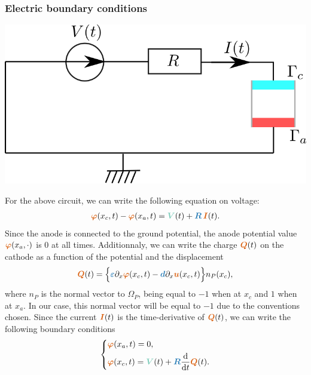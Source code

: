 \documentclass[11pt,a4paper]{article}
\newcommand{\unknown}[1]{\bm{{\color{myred}{#1}}}}
\newcommand{\param}[1]{\bm{{\color{myhyperblue}{#1}}}}
\newcommand{\data}[1]{\bm{{\color{mygreen}{#1}}}}
\begin{document}
\subsubsection{Electric boundary conditions}
\begin{center}
\includegraphics[scale=1]{figures/electric_circuit.png} 
\end{center}

For the above circuit, we can write the following equation on voltage:
\begin{equation*}
\begin{aligned}
\unknown{\varphi}(x_c, t) - \unknown{\varphi}(x_a, t) = \data{V}(t) + \param{R} \, \unknown{I}(t).
\end{aligned}
\end{equation*}
Since the anode is connected to the ground potential, the anode potential value $\unknown{\varphi}(x_a, \cdot)$ is 0 at all times. Additionnaly, we can write the charge $\unknown{Q}(t)$ on the cathode as a function of the potential and the displacement
\begin{equation*}
\begin{aligned}
\unknown{Q}(t) = \Big\{ \param{\varepsilon} \partial_x \unknown{\varphi}(x_c, t) - \param{d} \partial_x \unknown{u}(x_c, t) \Big\} n_P(x_c),
\end{aligned}
\end{equation*}
where $n_P$ is the normal vector to $\Omega_P$, being equal to $-1$ when at $x_c$ and $1$ when at $x_a$. In our case, this normal vector will be equal to $-1$ due to the conventions chosen. Since the current $\unknown{I}(t)$ is the time-derivative of $\unknown{Q}(t)$, we can write the following boundary conditions
\begin{equation*}
\left\lbrace
\begin{aligned}
&\unknown{\varphi}(x_a, t) = 0, \\
&\unknown{\varphi}(x_c, t) = \data{V}(t) + \param{R} \dfrac{\mathrm{d}}{\mathrm{d}t}\unknown{Q}(t).
\end{aligned}
\right.
\end{equation*}
\end{document}
